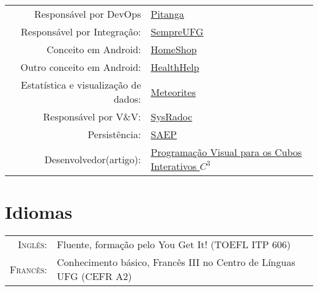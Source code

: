 \documentclass[a4paper,10pt]{article} %
\begin{document}
\begin{tabular}{rl}
	Responsável por DevOps &
	\href{https://github.com/SaladaDeFrutas/Pitanga}{Pitanga} \\
	Responsável por Integração: &
	\href{https://github.com/ES-INF-UFG-2016-2/Sempre-UFG}{SempreUFG} \\
	Conceito em Android: &
	\href{https://github.com/Yuri-M-Dias/HomeShop}{HomeShop} \\
	Outro conceito em Android: &
	\href{https://github.com/Yuri-M-Dias/HealthHelp}{HealthHelp} \\
	Estatística e visualização de dados: &
	\href{https://github.com/Yuri-M-Dias/meteorites}{Meteorites} \\
	Responsável por V\&V: &
	\href{https://bitbucket.org/SysRadocTeam/sysradoc}{SysRadoc} \\
	Persistência: &
	\href{https://github.com/Yuri-M-Dias/SAEP}{SAEP} \\

	Desenvolvedor(artigo): &
	\href{https://siimi.medialab.ufg.br/up/777/o/49_cubos_interativos.pdf}{Programação Visual para os Cubos Interativos $C^3$} \\


\end{tabular}


\section{Idiomas}

\begin{tabular}{rl}

	\textsc{Inglês:} & Fluente, formação pelo You Get It! (TOEFL ITP 606)\\

	\textsc{Francês:} & Conhecimento básico, Francês III no Centro de Línguas UFG (CEFR A2)\\

\end{tabular}
\end{document}
